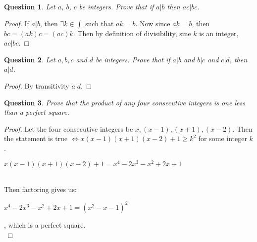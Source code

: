 \documentclass[11pt,oneside]{article}
\newtheorem{question}{Question}
\begin{document}
\begin{question}
	Let $a$, $b$, $c$ be integers. Prove that if $a | b$ then $ac | bc$.
\end{question}
\begin{proof}
	If $a | b$, then $\exists k \in \int$ such that $ak = b$.
	Now since $ak = b$, then $bc = (ak)c = (ac)k$. Then by definition of divisibility, sine $k$ is an integer, $ac|bc$.
\end{proof}

\begin{question}
	Let $a, b, c$ and $d$ be integers. Prove that if $a|b$ and $b|c$ and $c|d$, then $a|d$.
\end{question}
\begin{proof}
	By transitivity $a|d$.
\end{proof}

\begin{question}
	Prove that the product of any four consecutive integers is one less than a perfect square.
\end{question}
\begin{proof}
	Let the four consecutive integers be $x, (x-1), (x+1), (x-2)$. Then the statement is true $\iff x(x-1)(x+1)(x-2)+1 \geq k^2$ for some integer $k$.
	\centerline{$x(x-1)(x+1)(x-2)+1 = x^4-2x^3-x^2+2x+1$}\\
	Then factoring gives us:\\
	\centerline{$x^4-2x^3-x^2+2x+1 = (x^2 - x -1)^2$}, which is a perfect square.\\
\end{proof}
\end{document}
